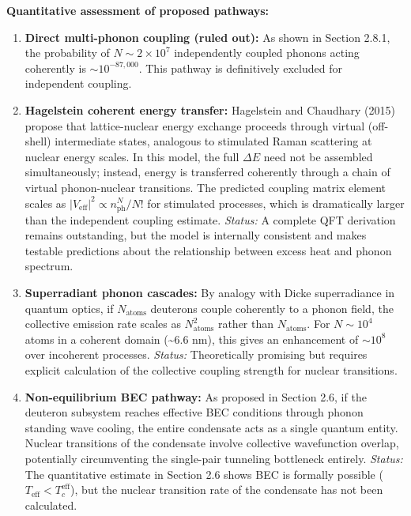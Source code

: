 \documentclass[11pt,a4paper]{article}
\begin{document}
\textbf{Quantitative assessment of proposed pathways:}

\begin{enumerate}
\def\labelenumi{\arabic{enumi}.}
\item
  \textbf{Direct multi-phonon coupling (ruled out):} As shown in Section 2.8.1, the probability of $N \sim 2 \times 10^7$ independently coupled phonons acting coherently is $\sim 10^{-87,000}$. This pathway is definitively excluded for independent coupling.
\item
  \textbf{Hagelstein coherent energy transfer:} Hagelstein and Chaudhary (2015) propose that lattice-nuclear energy exchange proceeds through virtual (off-shell) intermediate states, analogous to stimulated Raman scattering at nuclear energy scales. In this model, the full $\Delta E$ need not be assembled simultaneously; instead, energy is transferred coherently through a chain of virtual phonon-nuclear transitions. The predicted coupling matrix element scales as $|V_{\text{eff}}|^2 \propto n_{\text{ph}}^N / N!$ for stimulated processes, which is dramatically larger than the independent coupling estimate. \emph{Status:} A complete QFT derivation remains outstanding, but the model is internally consistent and makes testable predictions about the relationship between excess heat and phonon spectrum.
\item
  \textbf{Superradiant phonon cascades:} By analogy with Dicke superradiance in quantum optics, if $N_{\text{atoms}}$ deuterons couple coherently to a phonon field, the collective emission rate scales as $N_{\text{atoms}}^2$ rather than $N_{\text{atoms}}$. For $N \sim 10^4$ atoms in a coherent domain (\textasciitilde6.6 nm), this gives an enhancement of $\sim 10^8$ over incoherent processes. \emph{Status:} Theoretically promising but requires explicit calculation of the collective coupling strength for nuclear transitions.
\item
  \textbf{Non-equilibrium BEC pathway:} As proposed in Section 2.6, if the deuteron subsystem reaches effective BEC conditions through phonon standing wave cooling, the entire condensate acts as a single quantum entity. Nuclear transitions of the condensate involve collective wavefunction overlap, potentially circumventing the single-pair tunneling bottleneck entirely. \emph{Status:} The quantitative estimate in Section 2.6 shows BEC is formally possible ($T_{\text{eff}} < T_c^{\text{eff}}$), but the nuclear transition rate of the condensate has not been calculated.
\end{enumerate}
\end{document}
